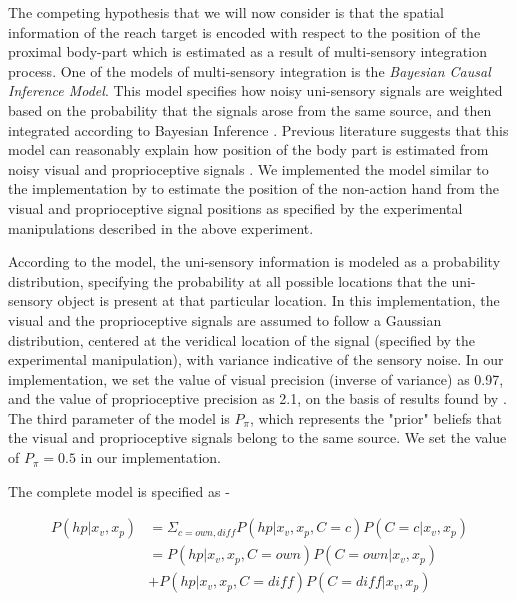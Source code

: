 The competing hypothesis that we will now consider is that the spatial information of the reach target is encoded with respect to the position of the proximal body-part which is estimated as a result of multi-sensory integration process. One of the models of multi-sensory integration is the \textit{Bayesian Causal Inference Model}. This model specifies how noisy uni-sensory signals are weighted based on the probability that the signals arose from the same source, and then integrated according to Bayesian Inference \cite{kording2007causal, meijer2020computational}. Previous literature suggests that this model can reasonably explain how position of the body part is estimated from noisy visual and proprioceptive signals \cite{noel2018peri, fossataro2020immersive}. We implemented the model similar to the implementation by  to estimate the position of the non-action hand from the visual and proprioceptive signal positions as specified by the experimental manipulations described in the above experiment.

According to the model, the uni-sensory information is modeled as a probability distribution, specifying the probability at all possible locations that the uni-sensory object is present at that particular location. In this implementation, the visual and the proprioceptive signals are assumed to follow a Gaussian distribution, centered at the veridical location of the signal (specified by the experimental manipulation), with variance indicative of the sensory noise. In our implementation, we set the value of visual precision (inverse of variance) as 0.97, and the value of proprioceptive precision as 2.1, on the basis of results found by . The third parameter of the model is $P_\pi$, which represents the "prior" beliefs that the visual and proprioceptive signals belong to the same source. We set the value of $P_\pi = 0.5$ in our implementation.

The complete model is specified as - 

\begin{align*}   
    P(hp | x_v, x_p) 
    &= \Sigma_{c=own,diff} P(hp | x_v, x_p, C = c) P(C = c | x_v,x_p ) \\ 
    &= P(hp | x_v, x_p, C = own) P(C = own | x_v,x_p ) \\
    &+ P(hp | x_v, x_p, C = diff) P(C = diff | x_v,x_p )
\end{align*}

